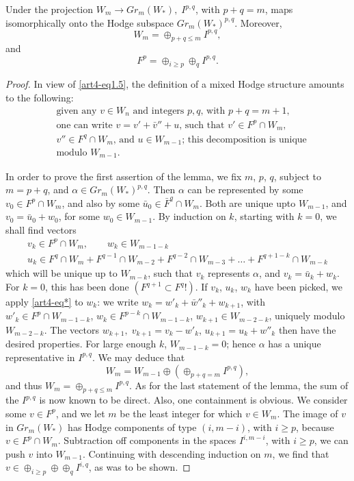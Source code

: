 \begin{lemma}\label{art4-lem1.12}
Under the projection $W_m \to Gr_m (W_\ast), \; I^{p,q}$, with $p+q=m$, maps isomorphically onto the Hodge subspace $Gr_m (W_\ast)^{p,q}$. Moreover,
$$
W_m = \oplus_{p+q\leqslant m} I^{p,q},
$$
and 
$$
F^p = \oplus_{i \geqslant p} \oplus_q I^{p,q}.
$$
\end{lemma}

\begin{proof}
In view of \eqref{art4-eq1.5}, the definition of a mixed Hodge structure amounts to the following:
\begin{align*}
& \text{given any $v \in W_n$ and integers $p,q$, with $p+q=m+1$,}\\
& \text{one can write $v = v'+\bar{v}'' + u $, such that $v' \in F^p \cap W_m$,}\\
& \text{$v'' \in F^q \cap W_m$, and $u\in W_{m-1}$; this decomposition is unique}\\
& \text{modulo $W_{m-1}$}. \tag{$\ast$}\label{art4-eq*}
\end{align*}

In order to prove the first assertion of the lemma, we fix $m$, $p$, $q$, subject to $m=p+q$, and $\alpha \in Gr_m (W_\ast)^{p,q}$. Then $\alpha$ can be represented by some\pageoriginale $v_0\in F^p \cap W_m$, and also by some $\bar{u}_0 \in \bar{F}^q \cap W_m$. Both are unique upto $W_{m-1}$, and $v_0 = \bar{u}_0 + w_0$, for some $w_0 \in W_{m-1}$. By induction on $k$, starting with $k=0$, we shall find vectors
\begin{gather*}
v_k \in F^p \cap W_m, \qquad w_k \in W_{m-1-k}\\
u_k \in F^q \cap W_m + F^{q-1} \cap W_{m-2} + F^{q-2} \cap W_{m-3} + \ldots + F^{q+1-k} \cap W_{m-k}
\end{gather*}
which will be unique up to $W_{m-k}$, such that $v_k$ represents $\alpha$, and $v_k = \bar{u}_k + w_k$. For $k=0$, this has been done $(F^{q+1} \subset F^q !)$.  If $v_k$, $u_k$, $w_k$ have been picked, we apply \eqref{art4-eq*} to $w_k$: we write $w_k = w'_k + \bar{w}''_k + w_{k+1}$, with $w'_k \in F^p \cap W_{m-1-k}$, $w_k \in F^{p-k} \cap W_{m-1-k}$, $w_{k+1} \in W_{m-2-k}$, uniquely modulo $W_{m-2-k}$. The vectors $w_{k+1}, \; v_{k+1} = v_k - w'_k$, $u_{k+1} =  u_k + w''_k$ then have the desired properties. For large enough $k$, $W_{m-1-k} = 0$; hence $\alpha$ has a unique representative in $I^{p,q}$. We may deduce that
$$
W_m = W_{m-1} \oplus (\oplus_{p+q=m} I^{p,q}),
$$
and thus $W_m = \oplus_{p+q\leqslant m} I^{p,q}$. As for the last statement of the lemma, the sum of the $I^{p,q}$ is now known to be direct. Also, one containment is obvious. We consider some $v \in F^p$, and we let $m$ be the least integer for which $v \in W_m$. The image of $v$ in $Gr_m (W_\ast)$ has Hodge components of type $(i, m-i)$, with $i \geqslant p$, because $v \in F^p \cap W_m$. Subtraction off components in the spaces $I^{i,m-i}$, with $i \geqslant p$, we can push $v$ into $W_{m-1}$. Continuing with descending induction on $m$, we find that $v \in \oplus_{i \geqslant p} \oplus \oplus_q I^{i,q}$, as was to be shown.
 

\end{proof}
